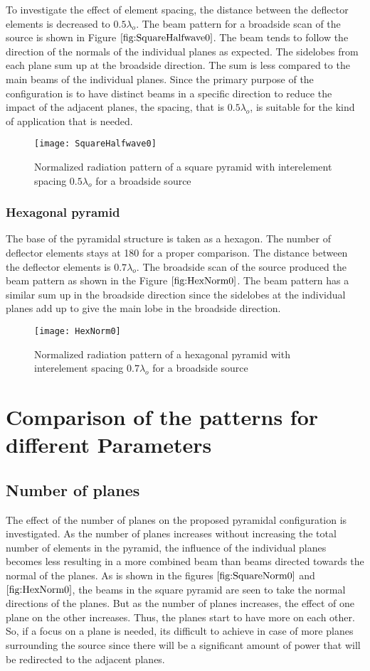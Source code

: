 \documentclass[titlepage]{article}
\begin{document}
\newline
To investigate the effect of element spacing, the distance between the deflector elements is decreased to $0.5 \lambda_o$. The beam pattern for a broadside scan of the source is shown in Figure $\ref{fig:SquareHalfwave0}$. The beam tends to follow the direction of the normals of the individual planes as expected. The sidelobes from each plane sum up at the broadside direction. The sum is less compared to the main beams of the individual planes. Since the primary purpose of the configuration is to have distinct beams in a specific direction to reduce the impact of the adjacent planes, the spacing, that is $0.5 \lambda_o$, is suitable for the kind of application that is needed.
\begin{figure}[!hbp]
\centering
\texttt{[image: SquareHalfwave0]}
\caption{Normalized radiation pattern of a square pyramid with interelement spacing $0.5\lambda_o$ for a broadside source}
\label{fig:SquareHalfwave0}
\end{figure}
\subsubsection{Hexagonal pyramid}
The base of the pyramidal structure is taken as a hexagon. The number of deflector elements stays at 180 for a proper comparison. The distance between the deflector elements is $0.7 \lambda_o$. The broadside scan of the source produced the beam pattern as shown in the Figure $\ref{fig:HexNorm0}$. The beam pattern has a similar sum up in the broadside direction since the sidelobes at the individual planes add up to give the main lobe in the broadside direction.
\begin{figure}[!hbp]
\centering
\texttt{[image: HexNorm0]}
\caption{Normalized radiation pattern of a hexagonal pyramid with interelement spacing $0.7 \lambda_o$ for a broadside source}
\label{fig:HexNorm0}
\end{figure}
\section{Comparison of the patterns for different Parameters}
\subsection{Number of planes}
The effect of the number of planes on the proposed pyramidal configuration is investigated. As the number of planes increases without increasing the total number of elements in the pyramid, the  influence of the individual planes becomes less resulting in a more combined beam than beams directed towards the normal of the planes. As is shown in the figures $\ref{fig:SquareNorm0}$ and $\ref{fig:HexNorm0}$, the beams in the square pyramid are seen to take the normal directions of the planes. But as the number of planes increases, the effect of one plane on the other increases. Thus, the planes start to have more on each other. So, if a focus on a plane is needed, its difficult to achieve in case of more planes surrounding the source since there will be a significant amount of power that will be redirected to the adjacent planes.
\end{document}
